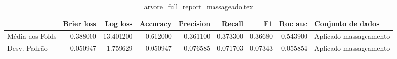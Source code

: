 \begin{table}
\centering
\caption{arvore_full_report_massageado.tex}
\label{arvore_full_report_massageado.tex}
\begin{tabular}{lrrrrrrrl}
\toprule
{}              &  Brier  loss &   Log loss &  Accuracy  &  Precision  &   Recall  &      F1  &  Roc auc  &       Conjunto de dados \\
\midrule
Média dos Folds &     0.388000 &  13.401200 &   0.612000 &    0.361100 &  0.373300 &  0.36680 &  0.543900 &  Aplicado massageamento \\
Desv. Padrão    &     0.050947 &   1.759629 &   0.050947 &    0.076585 &  0.071703 &  0.07343 &  0.055854 &  Aplicado massageamento \\
\bottomrule
\end{tabular}
\end{table}
